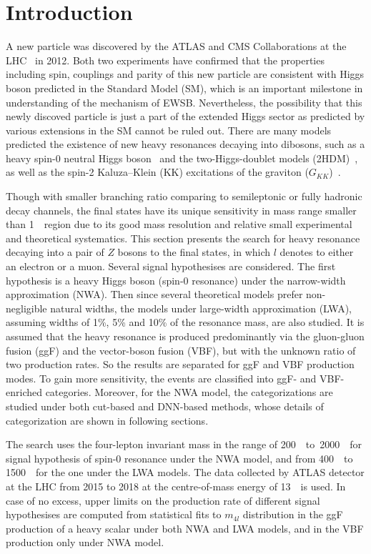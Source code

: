 \section{Introduction}

A new particle was discovered by the ATLAS and CMS Collaborations at the LHC~\cite{20121, 201230} in 2012.
Both two experiments have confirmed that the properties including spin, couplings and parity of this new particle are consistent with 
Higgs boson predicted in the Standard Model (SM), which is an important milestone in understanding of the mechanism of EWSB.
Nevertheless, the possibility that this newly discoved particle is just a part of the extended Higgs sector
as predicted by various extensions in the SM cannot be ruled out.
There are many models predicted the existence of new heavy resonances decaying into dibosons, 
such as a heavy spin-0 neutral Higgs boson~\cite{PhysRevD.36.3463}
and the two-Higgs-doublet models (2HDM)~\cite{BRANCO20121}, 
as well as the spin-2 Kaluza–Klein (KK) excitations of the graviton ($G_{KK}$)~\cite{DAVOUDIASL200043}.

Though with smaller branching ratio comparing to semileptonic or fully hadronic decay channels, the \llll final states have its unique sensitivity in mass range smaller than 1~\tev~region due to its good mass resolution and relative small experimental and theoretical systematics.
This section presents the search for heavy resonance decaying into a pair of $Z$ bosons to the \llll final states, in which $l$ denotes to either an electron or a muon. 
Several signal hypothesises are considered.
The first hypothesis is a heavy Higgs boson (spin-0 resonance) under the narrow-width approximation (NWA).
Then since several theoretical models prefer non-negligible natural widths, the models under large-width approximation (LWA), 
assuming widths of 1\%, 5\% and 10\% of the resonance mass, are also studied.
It is assumed that the heavy resonance is produced predominantly via the gluon-gluon fusion (ggF) and the vector-boson fusion (VBF), 
but with the unknown ratio of two production rates.
So the results are separated for ggF and VBF production modes.
To gain more sensitivity, the \llll events are classified into  ggF- and VBF-enriched categories.
Moreover, for the NWA model, the categorizations are  studied under both cut-based and DNN-based methods, whose details of categorization are shown in following sections.

The search uses the four-lepton invariant mass in the range of 200~\gev~to~2000~\gev~for signal hypothesis of spin-0 resonance under the NWA model,
and from 400~\gev~to 1500~\gev~for the one under the LWA models.
The data collected by ATLAS detector at the LHC from 2015 to 2018 at the centre-of-mass energy of 13~\tev~is used.
In case of no excess, upper limits on the production rate of different signal hypothesises are computed from statistical fits to $m_{4l}$ distribution
in the ggF production of a heavy scalar under both NWA and LWA models, and in the VBF production only under NWA model.

